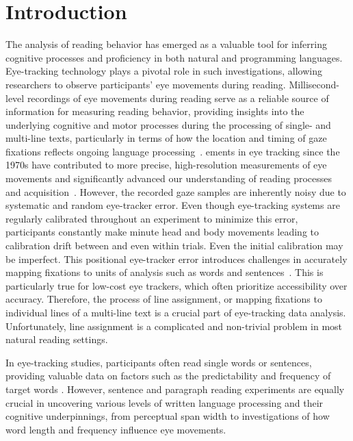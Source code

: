 \documentclass[twocolumn]{article}
\begin{document}
\twocolumn
\section{Introduction}

The analysis of reading behavior has emerged as a valuable tool for inferring cognitive processes and proficiency in both natural and programming languages\cite{glandorfSliceAlgorithmAssign2021}. Eye-tracking technology plays a pivotal role in such investigations, allowing researchers to observe participants' eye movements during reading. Millisecond-level recordings of eye movements during reading serve as a reliable source of information for measuring reading behavior, providing insights into the underlying cognitive and motor processes during the processing of single- and multi-line texts, particularly in terms of how the location and timing of gaze fixations reflects ongoing language processing~\cite{raynerEyeMovementsReading1998,rayner35thSirFrederick2009}. ements in eye tracking since the 1970s have contributed to more precise, high-resolution measurements of eye movements and significantly advanced our understanding of reading processes and acquisition~\cite{cohenSoftwareAutomaticCorrection2013}. However, the recorded gaze samples are inherently noisy due to systematic and random eye-tracker error. Even though eye-tracking systems are regularly calibrated throughout an experiment to minimize this error, participants constantly make minute head and body movements leading to calibration drift between and even within trials. Even the initial calibration may be imperfect. This positional eye-tracker error introduces challenges in accurately mapping fixations to units of analysis such as words and sentences~\cite{glandorfSliceAlgorithmAssign2021}. This is particularly true for low-cost eye trackers, which often prioritize accessibility over accuracy. Therefore, the process of line assignment, or mapping fixations to individual lines of a multi-line text is a crucial part of eye-tracking data analysis. Unfortunately, line assignment is a complicated and non-trivial problem in most natural reading settings.

In eye-tracking studies, participants often read single words or sentences, providing valuable data on factors such as the predictability and frequency of target words \cite{rayner35thSirFrederick2009}. However, sentence and paragraph reading experiments are equally crucial in uncovering various levels of written language processing and their cognitive underpinnings, from perceptual span width\cite{blytheVisualInformationCapture2009} to investigations of how word length and frequency influence eye movements\cite{josephWordLengthLanding2009,tiffin-richardsChildrenAdultsParafoveal2015}.
\end{document}

